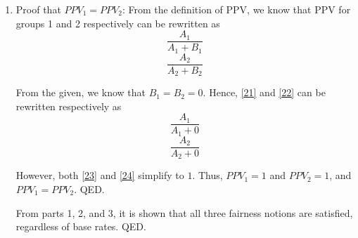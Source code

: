 \documentclass{cisXXX} %
\begin{document}
\begin{enumerate}
\item Proof that $PPV_1 = PPV_2$:
From the definition of PPV, we know that PPV for groups 1 and 2 respectively can be rewritten as
\begin{equation}
\label{21} \frac{A_1}{A_1 + B_1}
\end{equation}
\begin{equation}
\label{22} \frac{A_2}{A_2 + B_2}
\end{equation}

From the given, we know that $B_1 = B_2 = 0$. Hence, \eqref{21} and \eqref{22} can be rewritten respectively as
\begin{equation}
\label{23} \frac{A_1}{A_1 + 0}
\end{equation}
\begin{equation}
\label{24} \frac{A_2}{A_2 + 0}
\end{equation}

However, both \eqref{23} and \eqref{24} simplify to $1$. Thus, $PPV_1 = 1$ and $PPV_2 = 1$, and $PPV_1 = PPV_2$. QED.

From parts 1, 2, and 3, it is shown that all three fairness notions are satisfied, regardless of base rates. QED.
\end{enumerate}
\end{document}
